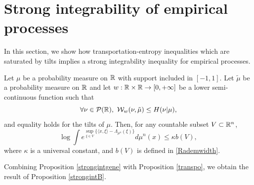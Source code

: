 \documentclass[a4paper,oneside,11pt]{article}
\begin{document}
\section{Strong integrability of  empirical processes}
In this section, we show how transportation-entropy inequalities which are saturated by tilts implies a strong integrability inequality for empirical processes. 

\begin{Pro}\label{strongintgene}
Let $\mu$ be a probability measure on $\mathbb{R}$ with support included in $[-1,1]$. 
Let $\tilde \mu$ be a probability measure on $\mathbb{R}$ and let $w : \mathbb{R}\times \mathbb{R} \to [0,+\infty]$ be a lower semi-continuous function such that 
$$ \forall \nu \in \mathcal{P}(\RR), \ \mathcal{W}_w(\nu,\tilde \mu) \leq H(\nu | \mu),$$
and equality holds for the tilts of $\mu$. 
Then, for any countable subset $V \subset \mathbb{R}^n$,
$$ \log \int e^{\sup_{\xi \in V} \{ \langle x,\xi \rangle - \Lambda_{\mu^n}(\xi)\} } d\mu^n(x) \leq \kappa b(V),$$
where $\kappa$ is a universal constant, and $b(V)$ is defined in \eqref{Rademwidth}.
\end{Pro}
Combining Proposition \ref{strongintgene} with Proposition \ref{transpo}, we obtain the result of Proposition \ref{strongintB}.
\end{document}
